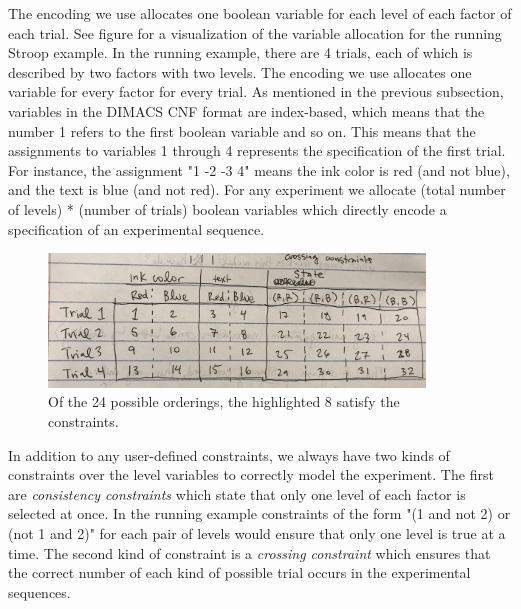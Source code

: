 The encoding we use allocates one boolean variable for each level of each factor of each trial. See figure  for a visualization of the variable allocation for the running Stroop example. In the running example, there are 4 trials, each of which is described by two factors with two levels. The encoding we use allocates one variable for every factor for every trial. As mentioned in the previous subsection, variables in the DIMACS CNF format are index-based, which means that the number 1 refers to the first boolean variable and so on. This means that the assignments to variables 1 through 4 represents the specification of the first trial. For instance, the assignment "1 -2 -3 4" means the ink color is red (and not blue), and the text is blue (and not red). For any experiment we allocate (total number of levels) * (number of trials) boolean variables which directly encode a specification of an experimental sequence.

\begin{figure}[t]
    \centerline{\includegraphics[origin=c,width=10cm]{stroop_crossing_vars}}
    \caption{Of the 24 possible orderings, the highlighted 8 satisfy the constraints.}%
    \label{fig:stroop_crossing_vars}%
\end{figure}

In addition to any user-defined constraints, we always have two kinds of constraints over the level variables to correctly model the experiment. The first are \emph{consistency constraints} which state that only one level of each factor is selected at once. In the running example constraints of the form "(1 and not 2) or (not 1 and 2)" for each pair of levels would ensure that only one level is true at a time. The second kind of constraint is a \emph{crossing constraint} which ensures that the correct number of each kind of possible trial occurs in the experimental sequences.

